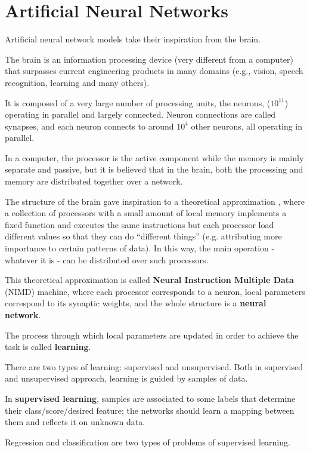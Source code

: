 \newpage
\chapter{Artificial Neural Networks}

Artificial neural network models take their inspiration from the brain.

The brain is an information processing device (very different from a computer) that surpasses current engineering products in many domains (e.g., vision, speech recognition, learning and many others).

It is composed of a very large number of processing units, the neurons, ($10^{11}$) operating in parallel and largely connected. Neuron connections are called synapses, and each neuron connects to around $10^4$ other neurons, all operating in parallel.

In a computer, the processor is the active component while the memory is mainly separate and passive, but it is believed that in the brain, both the processing and memory are distributed together over a network.

The structure of the brain gave inspiration to a theoretical approximation \cite{ml}, where a collection of processors with a small amount of local memory implements a fixed function and executes the same instructions but each processor load different values so that they can do ``different things'' (e.g. attributing more importance to certain patterns of data). In this way, the main operation - whatever it is - can be distributed over such processors.

This theoretical approximation is called \textbf{Neural Instruction Multiple Data} (NIMD) machine, where each processor corresponds to a neuron, local parameters correspond to its synaptic weights, and the whole structure is a \textbf{neural network}.

The process through which local parameters are updated in order to achieve the task is called \textbf{learning}.

There are two types of learning: supervised and unsupervised. Both in supervised and unsupervised approach, learning is guided by samples of data.

In \textbf{supervised learning}, samples are associated to some labels that determine their class/score/desired feature; the networks should learn a mapping between them and reflects it on unknown data.

Regression and classification are two types of problems of supervised learning.

